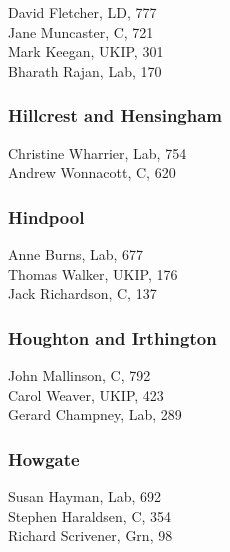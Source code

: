 \documentclass[a4paper,openany,10pt]{book}
\begin{document}


David Fletcher, LD, 777\\
Jane Muncaster, C, 721\\
Mark Keegan, UKIP, 301\\
Bharath Rajan, Lab, 170\\


\subsubsection*{Hillcrest and Hensingham}



Christine Wharrier, Lab, 754\\
Andrew Wonnacott, C, 620\\


\subsubsection*{Hindpool}



Anne Burns, Lab, 677\\
Thomas Walker, UKIP, 176\\
Jack Richardson, C, 137\\


\subsubsection*{Houghton and Irthington}



John Mallinson, C, 792\\
Carol Weaver, UKIP, 423\\
Gerard Champney, Lab, 289\\


\subsubsection*{Howgate}



Susan Hayman, Lab, 692\\
Stephen Haraldsen, C, 354\\
Richard Scrivener, Grn, 98\\
\end{document}

